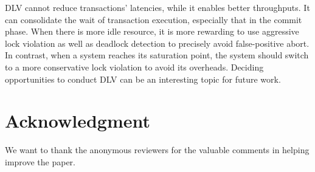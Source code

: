 \documentclass[conference]{IEEEtran}
\begin{document}

DLV cannot reduce transactions' latencies, while it enables better throughputs.
It can consolidate the wait of transaction execution, especially that in the commit phase.
When there is more idle resource, it is more rewarding to use aggressive lock violation as well as deadlock detection to precisely avoid false-positive abort.
In contrast, when a system reaches its saturation point, the system should switch to a more conservative
lock violation to avoid its overheads.
Deciding opportunities to conduct DLV can be an interesting topic for future work.


\section*{Acknowledgment}
We want to thank the anonymous reviewers for the valuable comments in helping improve the paper.




\end{document}
